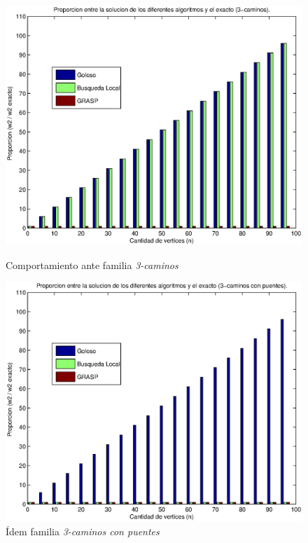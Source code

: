 \begin{figure}[H]
    \begin{minipage}{0.5\linewidth}
      \includegraphics[width=\linewidth]{graficos/todos_proporcion_3caminos.eps}
      \caption{Comportamiento ante familia \emph{3-caminos}}\label{fig:comportamiento-familia-rompe}
    \end{minipage}
    \hfill
    \begin{minipage}{0.5\linewidth}
      \includegraphics[width=\linewidth]{graficos/todos_proporcion_puentes.eps}
      \caption{Ídem familia \emph{3-caminos con puentes}}\label{fig:comportamiento-familia-puente}
    \end{minipage}    
\end{figure}

